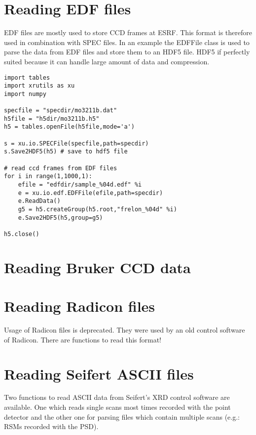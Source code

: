 \section{Reading EDF files}

EDF files are mostly used to store CCD frames at ESRF. This format is therefore used in combination with SPEC files. In an example the EDFFile class is used to parse the data from EDF files and store them to an HDF5 file. HDF5 if perfectly suited because it can handle large amount of data and compression.

\begin{lstlisting}[caption=script to parse and plot a reciprocal space map recorded with Seifert's XRD control software]
import tables 
import xrutils as xu
import numpy

specfile = "specdir/mo3211b.dat"
h5file = "h5dir/mo3211b.h5"
h5 = tables.openFile(h5file,mode='a')

s = xu.io.SPECFile(specfile,path=specdir)
s.Save2HDF5(h5) # save to hdf5 file

# read ccd frames from EDF files
for i in range(1,1000,1):
    efile = "edfdir/sample_%04d.edf" %i
    e = xu.io.edf.EDFFile(efile,path=specdir)
    e.ReadData()
    g5 = h5.createGroup(h5.root,"frelon_%04d" %i)
    e.Save2HDF5(h5,group=g5)

h5.close()
\end{lstlisting}

\section{Reading Bruker CCD data}

\section{Reading Radicon files}

Usage of Radicon files is deprecated. They were used by an old control software of Radicon. There are functions to read this format!

\section{Reading Seifert ASCII files}

Two functions to read ASCII data from Seifert's XRD control software are available. One which reads single scans most times recorded with the point detector and the other one for parsing files which contain multiple scans (e.g.: RSMs recorded with the PSD).

